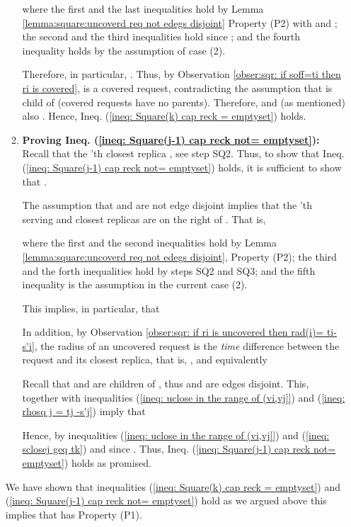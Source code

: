 \documentclass[11pt]{article}
\begin{document}
\begin{enumerate}
\begin{enumerate}
where the first and the last inequalities hold by Lemma \ref{lemma:square:uncoverd req not edegs disjoint} Property (P2) with  and ;
the second and the third inequalities hold since ; and
the fourth inequality holds by the assumption of case (2).

\vspace{0.5cm}
Therefore, in particular, .
Thus, by Observation \ref{obser:sqr: if soff=ti then ri is covered},  is a covered request,
contradicting the assumption that  is child of  (covered requests have no parents).
Therefore,  and (as mentioned) also .
Hence, Ineq. (\ref{ineq: Square(k) cap reck = emptyset}) holds.



\vspace{0.5cm}
\item[]{\bf Proving Ineq. (\ref{ineq: Square(j-1) cap reck not= emptyset}):}
Recall that the 'th closest replica , see step SQ2.
Thus, to show that Ineq. (\ref{ineq: Square(j-1) cap reck not= emptyset}) holds, it is sufficient to show that .


The assumption that  and  are not edge disjoint implies that the 'th serving and closest replicas are on the right of .
That is,

where the first and the second inequalities hold by Lemma \ref{lemma:square:uncoverd req not edegs disjoint}, Property (P2);
the third and the forth inequalities hold by steps SQ2 and SQ3;
and the fifth inequality is the assumption in the current case (2).

This implies, in particular, that

In addition,
by Observation \ref{obser:sqr: if ri is uncovered then rad(i)= ti-s'i},
the radius of an uncovered request is the {\em time} difference between the request and its closest replica, that is,
, and equivalently

Recall that  and  are children of , thus  and  are edges disjoint.
This, together with inequalities (\ref{ineq: uclose in the range of (vi,vj]}) and (\ref{ineq: rhosq j = tj -s'j})
imply that

Hence,  by inequalities (\ref{ineq: uclose in the range of (vi,vj]}) and (\ref{ineq: sclosej geq tk}) and since .
Thus, Ineq. (\ref{ineq: Square(j-1) cap reck not= emptyset}) holds as promised.

\end{enumerate}



We have shown that inequalities (\ref{ineq: Square(k) cap reck = emptyset}) and (\ref{ineq: Square(j-1) cap reck not= emptyset}) hold
as we argued above
this implies that  has Property (P1).












\end{enumerate}
\end{document}
